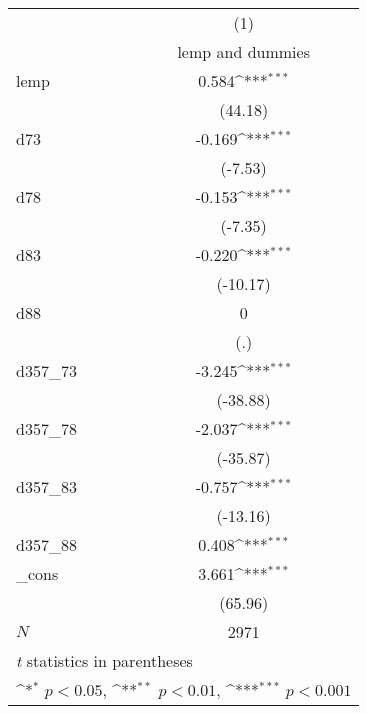 {
\def\sym#1{\ifmmode^{#1}\else\(^{#1}\)\fi}
\begin{tabular}{l*{1}{c}}
\hline\hline
            &\multicolumn{1}{c}{(1)}\\
            &\multicolumn{1}{c}{lemp and dummies}\\
\hline
lemp        &       0.584\sym{***}\\
            &     (44.18)         \\
[1em]
d73         &      -0.169\sym{***}\\
            &     (-7.53)         \\
[1em]
d78         &      -0.153\sym{***}\\
            &     (-7.35)         \\
[1em]
d83         &      -0.220\sym{***}\\
            &    (-10.17)         \\
[1em]
d88         &           0         \\
            &         (.)         \\
[1em]
d357\_73     &      -3.245\sym{***}\\
            &    (-38.88)         \\
[1em]
d357\_78     &      -2.037\sym{***}\\
            &    (-35.87)         \\
[1em]
d357\_83     &      -0.757\sym{***}\\
            &    (-13.16)         \\
[1em]
d357\_88     &       0.408\sym{***}\\
[1em]
\_cons      &       3.661\sym{***}\\
            &     (65.96)         \\
\hline
\(N\)       &        2971         \\
\hline\hline
\multicolumn{2}{l}{\footnotesize \textit{t} statistics in parentheses}\\
\multicolumn{2}{l}{\footnotesize \sym{*} \(p<0.05\), \sym{**} \(p<0.01\), \sym{***} \(p<0.001\)}\\
\end{tabular}
}
